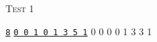 \textsc{Test 1}
\begin{console}[commandchars=\\\{\}]
\underline{\texttt{8}}
\underline{\texttt{0 0 1 0 1 3 5 1}}
0 0 0 0 1 3 3 1 \\
\end{console}
